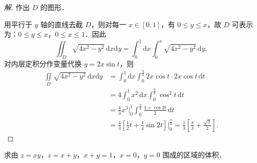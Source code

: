 \begin{proof}[解]
作出 $D$ 的图形．

\begin{figure}[htbp]
\centering
{}\caption{\relax}\label{fig:20-8}
\end{figure}

用平行于 $y$ 轴的直线去截 $D$，则对每一 $x\in[0,1]$，有 $0\leqslant y\leqslant x$，故 $D$ 可表示为：$0\leqslant y\leqslant x$，$0\leqslant x\leqslant 1$．因此
\[
\iint_{D}\sqrt{4x^{2}-y^{2}}\,\mathrm{d}x\mathrm{d}y=\int_{0}^{1}\mathrm{d}x\int_{0}^{x}\sqrt{4x^{2}-y^{2}}\,\mathrm{d}y.
\]
对内层定积分作变量代换 $y=2x\sin t$，则
\[
\begin{aligned}
\iint\limits_{D}\sqrt{4x^{2}-y^{2}}\,\mathrm{d}x\mathrm{d}y&=\int_{0}^{1}\mathrm{d}x\int_{0}^{\frac{\pi}{6}}2x\cos t\cdot 2x\cos t\,\mathrm{d}t\\
&=4\int_{0}^{1}x^{2}\,\mathrm{d}x\int_{0}^{\frac{\pi}{6}}\cos^{2}t\,\mathrm{d}t\\
&=\frac{4}{3}x^{3}\bigg|_{0}^{1}\int_{0}^{\frac{\pi}{6}}\frac{1+\cos 2t}{2}\,\mathrm{d}t\\
&=\frac{4}{3}\left[\frac{1}{2}t+\frac{1}{4}\sin 2t\right]\bigg|_{0}^{\frac{\pi}{6}}=\frac{1}{3}\left[\frac{\pi}{3}+\frac{\sqrt{3}}{2}\right].
\end{aligned}
\]
\end{proof}

\begin{example}\label{ex:20-2-3}
求由 $z=xy$，$z=x+y$，$x+y=1$，$x=0$，$y=0$ 围成的区域的体积．
\end{example}

